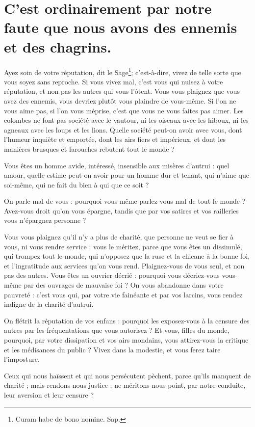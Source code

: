 \documentclass[instructions.tex]{subfiles}
\begin{document}
 
\chapter{C’est ordinairement par notre faute que nous avons des ennemis et des chagrins.}
 
\primo Ayez soin de votre réputation, dit le Sage\footnote{Curam habe de bono nomine. Sap.}; c’est-à-dire, vivez de telle sorte que vous soyez sans reproche. Si vous vivez mal, c’est vous qui nuisez à votre réputation, et non pas les autres qui vous l’ôtent. Vous vous plaignez que vous avez des ennemis, vous devriez plutôt vous plaindre de vous-même. Si l’on ne vous aime pas, si l’on vous méprise, c’est que vous ne vous faites pas aimer. Les colombes ne font pas société avec le vautour, ni les oiseaux avec les hiboux, ni les agneaux avec les loups et les lions. Quelle société peut-on avoir avec vous, dont l’humeur inquiète et emportée, dont les airs fiers et impérieux, et dont les manières brusques et farouches rebutent tout le monde ?
 
Vous êtes un homme avide, intéressé, insensible aux misères d’autrui : quel amour, quelle estime peut-on avoir pour un homme dur et tenant, qui n’aime que soi-même, qui ne fait du bien à qui que ce soit ?
 
On parle mal de vous : pourquoi vous-même parlez-vous mal de tout le monde ? Avez-vous droit qu’on vous épargne, tandis que par vos satires et vos railleries vous n’épargnez personne ?
 
Vous vous plaignez qu’il n’y a plus de charité, que personne ne veut se fier à vous, ni vous rendre service : vous le méritez, parce que vous êtes un dissimulé, qui trompez tout le monde, qui n’opposez que la ruse et la chicane à la bonne foi, et l’ingratitude aux services qu’on vous rend. Plaignez-vous de vous seul, et non pas des autres. Vous êtes un ouvrier décrié : pourquoi vous décriez-vous vous-même par des ouvrages de mauvaise foi ? On vous abandonne dans votre pauvreté : c’est vous qui, par votre vie fainéante et par vos larcins, vous rendez indigne de la charité d’autrui.
 
On flétrit la réputation de vos enfans : pourquoi les exposez-vous à la censure des autres par les fréquentations que vous autorisez ? Et vous, filles du monde, pourquoi, par votre dissipation et vos airs mondains, vous attirez-vous la critique et les médisances du public ? Vivez dans la modestie, et vous ferez taire l’imposture.
 
\secundo Ceux qui nous haïssent et qui nous persécutent pèchent, parce qu’ils manquent de charité ; mais rendons-nous justice ; ne méritons-nous point, par notre conduite, leur aversion et leur censure ?
 
\end{document}
